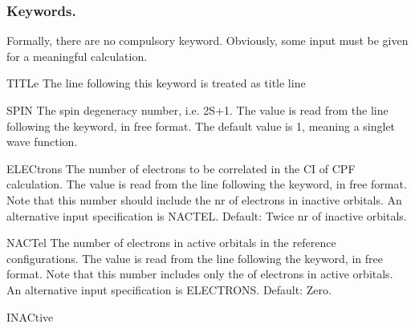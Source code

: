 \subsubsection{Keywords.}
Formally, there are no compulsory keyword. Obviously, some
input must be given for a meaningful calculation.
\begin{keywordlist}
\item[TITLe]
The line following this keyword is treated as title line
\item[SPIN]
The spin degeneracy number, i.e. 2S+1. The value is read from the
line following the keyword, in free format. The default value is
1, meaning a singlet wave function.
\item[ELECtrons]
The number of electrons to be correlated in the CI of CPF calculation.
The value is read from the line following the keyword, in free format.
Note that this number should include the nr of electrons in inactive
orbitals. An alternative input specification is NACTEL.
Default: Twice nr of inactive orbitals.
\item[NACTel]
The number of electrons in active orbitals in the reference configurations.
The value is read from the line following the keyword, in free format.
Note that this number includes only the of electrons in active
orbitals. An alternative input specification is ELECTRONS.
Default: Zero.
\item[INACtive]

\end{keywordlist}
